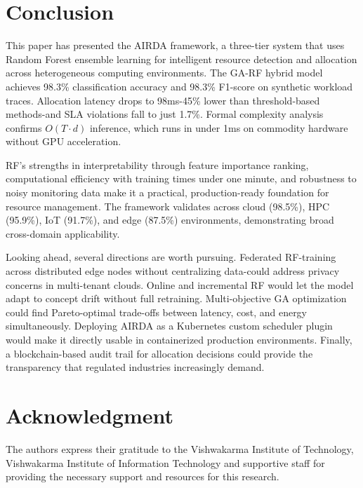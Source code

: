 \documentclass[conference]{IEEEtran}
\begin{document}
\section{\textbf{Conclusion}}
This paper has presented the AIRDA framework, a three-tier system that uses Random Forest ensemble learning for intelligent resource detection and allocation across heterogeneous computing environments. The GA-RF hybrid model achieves 98.3\% classification accuracy and 98.3\% F1-score on synthetic workload traces. Allocation latency drops to 98ms-45\% lower than threshold-based methods-and SLA violations fall to just 1.7\%. Formal complexity analysis confirms $O(T \cdot d)$ inference, which runs in under 1ms on commodity hardware without GPU acceleration.

RF's strengths in interpretability through feature importance ranking, computational efficiency with training times under one minute, and robustness to noisy monitoring data make it a practical, production-ready foundation for resource management. The framework validates across cloud (98.5\%), HPC (95.9\%), IoT (91.7\%), and edge (87.5\%) environments, demonstrating broad cross-domain applicability.

Looking ahead, several directions are worth pursuing. Federated RF-training across distributed edge nodes without centralizing data-could address privacy concerns in multi-tenant clouds. Online and incremental RF would let the model adapt to concept drift without full retraining. Multi-objective GA optimization could find Pareto-optimal trade-offs between latency, cost, and energy simultaneously. Deploying AIRDA as a Kubernetes custom scheduler plugin would make it directly usable in containerized production environments. Finally, a blockchain-based audit trail for allocation decisions could provide the transparency that regulated industries increasingly demand.

\section*{\textbf{Acknowledgment}}
The authors express their gratitude to the Vishwakarma Institute of Technology, Vishwakarma Institute of Information Technology and supportive staff for providing the necessary support and resources for this research.
\end{document}
